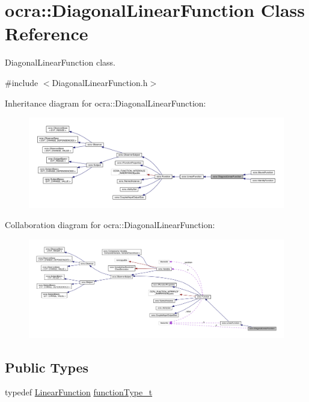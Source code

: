 \hypertarget{classocra_1_1DiagonalLinearFunction}{}\section{ocra\+:\+:Diagonal\+Linear\+Function Class Reference}
\label{classocra_1_1DiagonalLinearFunction}


Diagonal\+Linear\+Function class.  




{\ttfamily \#include $<$Diagonal\+Linear\+Function.\+h$>$}



Inheritance diagram for ocra\+:\+:Diagonal\+Linear\+Function\+:\nopagebreak
\begin{figure}[H]
\begin{center}
\leavevmode
\includegraphics[width=350pt]{d6/dc4/classocra_1_1DiagonalLinearFunction__inherit__graph}
\end{center}
\end{figure}


Collaboration diagram for ocra\+:\+:Diagonal\+Linear\+Function\+:\nopagebreak
\begin{figure}[H]
\begin{center}
\leavevmode
\includegraphics[width=350pt]{d4/d85/classocra_1_1DiagonalLinearFunction__coll__graph}
\end{center}
\end{figure}
\subsection*{Public Types}
\begin{DoxyCompactItemize}
\item 
typedef \hyperlink{classocra_1_1LinearFunction}{Linear\+Function} \hyperlink{classocra_1_1DiagonalLinearFunction_ab1d33ba63aea16f86fa88bf574333a39}{function\+Type\+\_\+t}
\end{DoxyCompactItemize}

